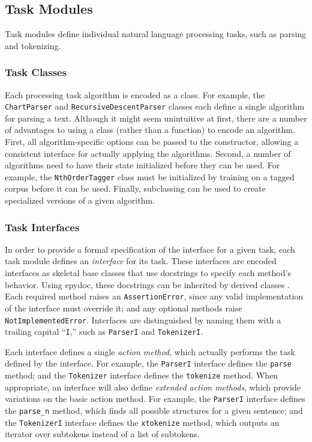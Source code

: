 \documentclass{article}
\begin{document}
\subsection{Task Modules}

Task modules define individual natural language processing tasks, such
as parsing and tokenizing.

\subsubsection{Task Classes}

Each processing task algorithm is encoded as a class.  For example,
the \texttt{ChartParser} and \texttt{Recursive\-Descent\-Parser} classes
each define a single algorithm for parsing a text.  Although it might
seem unintuitive at first, there are a number of advantages to using a
class (rather than a function) to encode an algorithm.  First, all
algorithm-specific options can be passed to the constructor, allowing
a consistent interface for actually applying the algorithms.  Second,
a number of algorithms need to have their state initialized before
they can be used.  For example, the \texttt{NthOrderTagger} class must
be initialized by training on a tagged corpus before it can be used.
Finally, subclassing can be used to create specialized versions of a
given algorithm.

\subsubsection{Task Interfaces}

In order to provide a formal specification of the interface for a
given task, each task module defines an \emph{interface} for its task.
These interfaces are encoded interfaces as skeletal base classes that
use docstrings to specify each method's behavior.  Using epydoc, these
docstrings can be inherited by derived classes \cite{epydoc}.  Each
required method raises an \texttt{AssertionError}, since any valid
implementation of the interface must override it; and any optional
methods raise \texttt{Not\-Implemented\-Error}.  Interfaces are
distinguished by naming them with a trailing capital ``\texttt{I},''
such as \texttt{ParserI} and \texttt{TokenizerI}.

Each interface defines a single \emph{action method}, which actually
performs the task defined by the interface.  For example, the
\texttt{ParserI} interface defines the \texttt{parse} method; and the
\texttt{Tokenizer} interface defines the \texttt{tokenize} method.
When appropriate, an interface will also define \emph{extended action
  methods}, which provide variations on the basic action method.  For
example, the \texttt{ParserI} interface defines the \texttt{parse\_n}
method, which finds all possible structures for a given sentence; and
the \texttt{TokenizerI} interface defines the \texttt{xtokenize}
method, which outputs an iterator over subtokens instead of a list of
subtokens.
\end{document}
